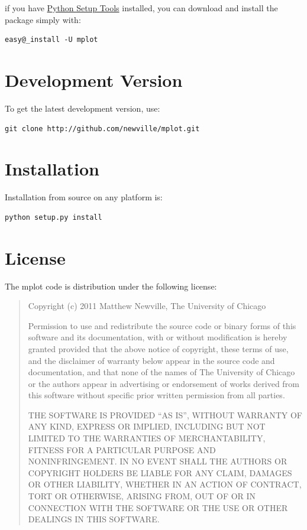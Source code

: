 \documentclass[letterpaper,10pt,english]{sphinxmanual}
\begin{document}
if you have \href{http://pypi.python.org/pypi/setuptools}{Python Setup Tools}  installed, you can download and install
the package simply with:

\begin{Verbatim}[commandchars=@\[\]]
easy@_install -U mplot
\end{Verbatim}


\section{Development Version}
\label{installation:development-version}
To get the latest development version, use:

\begin{Verbatim}[commandchars=@\[\]]
git clone http://github.com/newville/mplot.git
\end{Verbatim}


\section{Installation}
\label{installation:installation}
Installation from source on any platform is:

\begin{Verbatim}[commandchars=@\[\]]
python setup.py install
\end{Verbatim}


\section{License}
\label{installation:license}
The mplot code is distribution under the following license:
\begin{quote}

Copyright (c) 2011 Matthew Newville, The University of Chicago

Permission to use and redistribute the source code or binary forms of this
software and its documentation, with or without modification is hereby
granted provided that the above notice of copyright, these terms of use,
and the disclaimer of warranty below appear in the source code and
documentation, and that none of the names of The University of Chicago or
the authors appear in advertising or endorsement of works derived from this
software without specific prior written permission from all parties.

THE SOFTWARE IS PROVIDED ``AS IS'', WITHOUT WARRANTY OF ANY KIND, EXPRESS OR
IMPLIED, INCLUDING BUT NOT LIMITED TO THE WARRANTIES OF MERCHANTABILITY,
FITNESS FOR A PARTICULAR PURPOSE AND NONINFRINGEMENT.  IN NO EVENT SHALL
THE AUTHORS OR COPYRIGHT HOLDERS BE LIABLE FOR ANY CLAIM, DAMAGES OR OTHER
LIABILITY, WHETHER IN AN ACTION OF CONTRACT, TORT OR OTHERWISE, ARISING
FROM, OUT OF OR IN CONNECTION WITH THE SOFTWARE OR THE USE OR OTHER
DEALINGS IN THIS SOFTWARE.
\end{quote}
\end{document}
